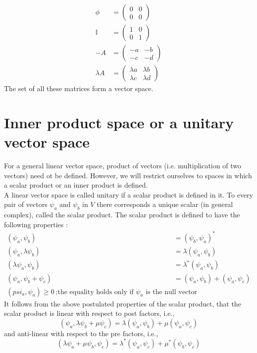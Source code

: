 \begin{enumerate}
	\begin{eqnarray}\label{eqn:2.24-2.27}
		\phi &= \left(
		\begin{matrix}
			0 & 0 \\ 0 & 0
		\end{matrix}
		\right)\\
		\mathbb{I} &= \left(
		\begin{matrix}
			1 & 0 \\ 0 & 1
		\end{matrix}
		\right)\\
		-A &= \left(
		\begin{matrix}
			-a & -b \\ -c & -d
		\end{matrix}
		\right)\\
		\lambda A &= \left(
		\begin{matrix}
			\lambda a & \lambda b \\ \lambda c & \lambda d
		\end{matrix}
		\right)
	\end{eqnarray}
	The set of all these matrices form a vector space.						
\end{enumerate}

\section{Inner product space or a unitary vector space}\label{inner_product}
For a general linear vector space, product of vectors (i.e. multiplication of two vectors) need ot be defined. However, we will restrict ourselves to spaces in which a  scalar product or an inner product is defined.\\
A linear vector space is called unitary if a scalar product is defined in it. To every pair of vectors $\psi_a$ and $\psi_b$ in $V$ there corresponds a unique scalar (in general complex), called the scalar product. The scalar product is defined to have the following properties :
\begin{eqnarray}\label{eqn:2.28-2.32}
	(\psi_a , \psi_b) &= (\psi_b, \psi_a)^* \\
	(\psi_a , \lambda \psi_b) &= \lambda (\psi_a , \psi_b) \\
	(\lambda \psi_a , \psi_b) &= \lambda^* (\psi_a , \psi_b) \\
	(\psi_a , \psi_b + \psi_c) &= (\psi_a , \psi_b) + (\psi_a , \psi_c) \\
	(psi_a, \psi_a) \geq 0 \ \text{;the equality holds only if $\psi_a$ is the null vector}
\end{eqnarray}
It follows from the above postulated properties of the scalar product, that the scalar product is linear with respect to post factors, i.e.,
\begin{equation}\label{eqn:2.33}
(\psi_a, \lambda \psi_b + \mu \psi_c) = \lambda (\psi_a , \psi_b) + \mu (\psi_a , \psi_c)
\end{equation}
and anti-linear with respect to the pre factors, i.e.,
\begin{equation}\label{eqn:2.34}
(\lambda \psi_a + \mu \psi_b, \psi_c ) = \lambda^* (\psi_a , \psi_c) + \mu^* (\psi_b , \psi_c)
\end{equation}

